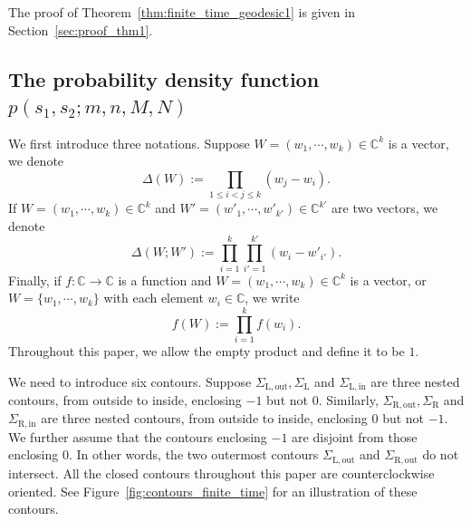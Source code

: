 \documentclass{article}
\numberwithin{equation}{section}
\newcommand{\complexC}{\mathbb{C}}
\newcommand{\inn}{\mathrm{in}}
\newcommand{\LL}{\mathrm{L}}
\newcommand{\out}{\mathrm{out}}
\newcommand{\RR}{\mathrm{R}}
\begin{document}
The proof of Theorem~\ref{thm:finite_time_geodesic1} is given in Section~\ref{sec:proof_thm1}.

\subsection{The probability density function $p(s_1,s_2;m,n,M,N)$}

We first introduce three notations. Suppose $W=(w_1,\cdots,w_k)\in\complexC^k$ is a vector, we denote
\begin{equation}
	\label{eq:def_Delta1}
	\Delta(W):=\prod_{1\le i<j\le k}(w_j-w_i).
\end{equation}
If $W=(w_1,\cdots,w_k)\in\complexC^k$ and $W'=(w'_1,\cdots,w'_{k'})\in\complexC^{k'}$ are two vectors, we denote
\begin{equation}
	\label{eq:def_Delta2}
	\Delta(W;W'):= \prod_{i=1}^k\prod_{i'=1}^{k'}(w_i-w'_{i'}).
\end{equation}
Finally, if $f:\complexC\to\complexC$ is a function and $W=(w_1,\cdots,w_k)\in\complexC^k$ is a vector, or $W=\{w_1,\cdots,w_k\}$ with each element $w_i\in\complexC$, we write
\begin{equation}
	\label{eq:def_f_vector}
	f(W):=\prod_{i=1}^k f(w_i).
\end{equation}
Throughout this paper, we allow the empty product and define it to be $1$.


We need to introduce six contours. Suppose $\Sigma_{\LL,\out},\Sigma_\LL$ and $\Sigma_{\LL,\inn}$ are three nested contours, from outside to inside, enclosing $-1$ but not $0$. Similarly, $\Sigma_{\RR,\out},\Sigma_\RR$ and $\Sigma_{\RR,\inn}$ are three nested contours, from outside to inside, enclosing $0$ but not $-1$. We further assume that the contours enclosing $-1$ are disjoint from those enclosing $0$. In other words, the two outermost contours $\Sigma_{\LL,\out}$ and $\Sigma_{\RR,\out}$ do not intersect. All the closed contours throughout this paper are counterclockwise oriented. See Figure~\ref{fig:contours_finite_time} for an illustration of these contours.
\end{document}

